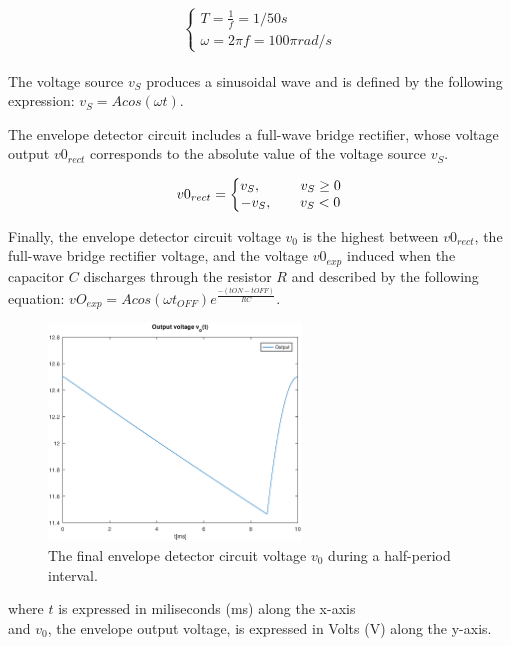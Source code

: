 \[
\left\{\begin{matrix}
T = \frac{1}{f} = 1/50 s\\
\omega = 2 \pi f = 100 \pi rad/s
\end{matrix}\right.
\]

\paragraph{}
The voltage source $v_S$ produces a sinusoidal wave and is defined by the following expression: $v_S=Acos(\omega t)$.

The envelope detector circuit includes a full-wave bridge rectifier, whose voltage output $v0_{rect}$ corresponds to the absolute value of the voltage source $v_S$.

\[
v0_{rect} =
\left\{\begin{matrix}
v_S, \hspace{1cm} v_S \ge 0\\
-v_S,\hspace{0.7cm} v_S < 0\\
\end{matrix}\right.
\]

Finally, the envelope detector circuit voltage $v_0$ is the highest between $v0_{rect}$, the full-wave bridge rectifier voltage, and the voltage $v0_{exp}$ induced when the capacitor $C$ discharges through the resistor $R$ and described by the following equation: $vO_{exp}=Acos(\omega t_{OFF})e^{\frac{-({tON}-{tOFF})}{RC}}$.


\begin{figure}[H] \centering
\includegraphics[width=0.6\textwidth]{envelope.eps}
\caption{The final envelope detector circuit voltage $v_0$ during a half-period interval.}
\label{fig:envelope}
\end{figure}

where $t$ is expressed in miliseconds (ms) along the x-axis\\
and $v_0$, the envelope output voltage, is expressed in Volts (V) along the y-axis.

